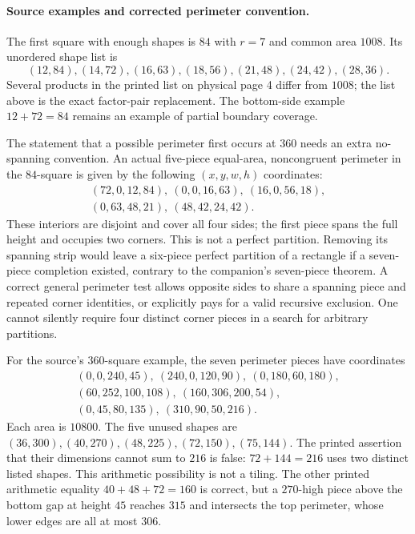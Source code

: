 \documentclass[11pt]{article}
\begin{document}
\paragraph{Source examples and corrected perimeter convention.}
The first square with enough shapes is $84$ with $r=7$ and common area $1008$.
Its unordered shape list is
\[
 (12,84),(14,72),(16,63),(18,56),(21,48),(24,42),(28,36).
\]
Several products in the printed list on physical page 4 differ from $1008$;
the list above is the exact factor-pair replacement. The bottom-side example
$12+72=84$ remains an example of partial boundary coverage.

The statement that a possible perimeter first occurs at $360$ needs an extra
no-spanning convention. An actual five-piece equal-area, noncongruent perimeter
in the $84$-square is given by the following $(x,y,w,h)$ coordinates:
\[
\begin{gathered}
(72,0,12,84),\ (0,0,16,63),\ (16,0,56,18),\\
(0,63,48,21),\ (48,42,24,42).
\end{gathered}
\]
These interiors are disjoint and cover all four sides; the first piece spans
the full height and occupies two corners. This is not a perfect partition.
Removing its spanning strip would leave a six-piece perfect partition of a
rectangle if a seven-piece completion existed, contrary to the companion's
seven-piece theorem. A correct general perimeter test allows opposite sides
to share a spanning piece and repeated corner identities, or explicitly pays
for a valid recursive exclusion. One cannot silently require four distinct
corner pieces in a search for arbitrary partitions.

For the source's $360$-square example, the seven perimeter pieces have coordinates
\[
\begin{gathered}
(0,0,240,45),\ (240,0,120,90),\ (0,180,60,180),\\
(60,252,100,108),\ (160,306,200,54),\\
(0,45,80,135),\ (310,90,50,216).
\end{gathered}
\]
Each area is $10800$. The five unused shapes are
$(36,300),(40,270),(48,225),(72,150),(75,144)$.
The printed assertion that their dimensions cannot sum to $216$ is false:
$72+144=216$ uses two distinct listed shapes. This arithmetic possibility is not
a tiling. The other printed arithmetic equality $40+48+72=160$ is correct,
but a $270$-high piece above the bottom gap at height $45$ reaches $315$ and
intersects the top perimeter, whose lower edges are all at most $306$.
\end{document}
